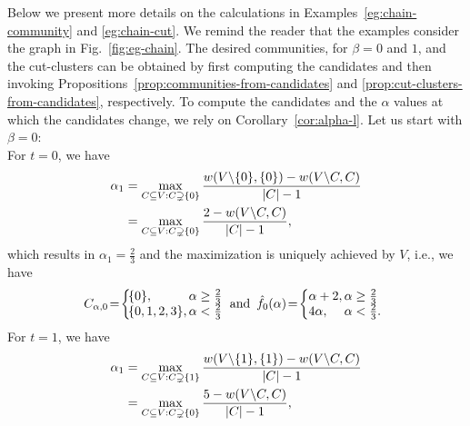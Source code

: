 Below we present more details on the calculations in Examples~\ref{eg:chain-community} and
\ref{eg:chain-cut}.
We remind the reader that the examples consider the graph in Fig.~\ref{fig:eg-chain}.
The desired communities, for $\beta = 0$ and $1$, and the cut-clusters can be obtained by first computing the
candidates and then invoking Propositions~\ref{prop:communities-from-candidates}
and \ref{prop:cut-clusters-from-candidates}, respectively.
To compute the candidates and the $\alpha$ values at which the candidates change, we rely on
Corollary~\ref{cor:alpha-l}.
Let us start with $\beta = 0$:
\\
For $t = 0$, we have
\begin{align*}
	\alpha_1
		&=
		\max_{C\subseteq V:C\supsetneq \{0\}} \frac{w(V\backslash \{0\},\{0\}) - w(V\backslash C,C)}{|C|-1} \\
		& = 
		\max_{C\subseteq V:C\supsetneq \{0\}} \frac{2 - w(V\backslash C,C)}{|C|-1},
\end{align*}
which results in $\alpha_1 = \frac{2}{3}$ and the maximization is uniquely achieved by $V$, i.e., we
have
\begin{align*}
	\begin{array}{lll}
	C_{\alpha,0} \! = \! \left\{
	\!\!
		\begin{array}{ll}
		\!\!
			\Set{0}, \!\! & \!\!\! \alpha \geq  \frac{2}{3}
			\\
			\!\!
			\Set{0,1,2,3}, \!\! & \!\!\! \alpha < \frac{2}{3}
		\end{array}
		\!\!\!
		\right.
		& 
		\!\!\!
		\text{and}
		\!\!\!
		&
	\hat{f}_{0}(\alpha) \! = \! \left\{
		\begin{array}{ll}
			\!\!\! \alpha + 2, \!\! &\!\!\!  \alpha \geq \frac{2}{3}
			\\
			\!\!\! 4\alpha, \!\! &\!\!\! \alpha < \frac{2}{3}
			.
		\end{array}
		\right.
	\end{array}
\end{align*}
%
For $t = 1$, we have
\begin{align*}
	\alpha_1
		&=
		\max_{C\subseteq V:C\supsetneq \{1\}} \frac{w(V\backslash \{1\},\{1\}) - w(V\backslash C,C)}{|C|-1} \\
		& = 
		\max_{C\subseteq V:C\supsetneq \{0\}} \frac{5 - w(V\backslash C,C)}{|C|-1},
\end{align*}
